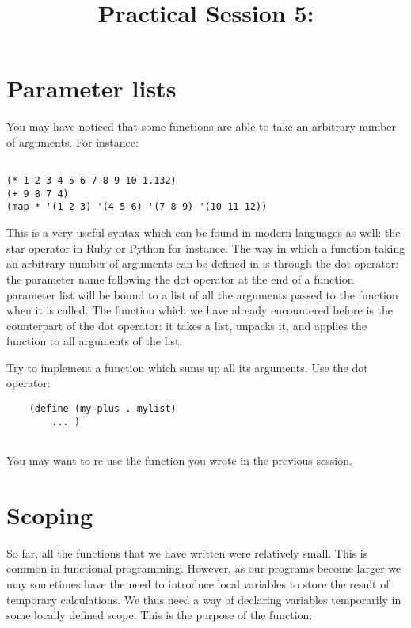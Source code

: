 \documentclass{../../../tp}
\title{Practical Session 5: \scheme}
\author{}
\begin{document}
	
	\maketitle

\section{Parameter lists}

You may have noticed that some \scheme functions are able to take an arbitrary number of arguments. For instance: 

\begin{verbatim}

(* 1 2 3 4 5 6 7 8 9 10 1.132)
(+ 9 8 7 4)
(map * '(1 2 3) '(4 5 6) '(7 8 9) '(10 11 12))

\end{verbatim}

This is a very useful syntax which can be found in modern languages as well: the star operator in Ruby or Python for instance. The way in which a function taking an arbitrary number of arguments can be defined in \scheme is through the dot operator: the parameter name following the dot operator at the end of a function parameter list will be bound to a list of all the arguments passed to the function when it is called. The  function which we have already encountered before is the counterpart of the dot operator: it takes a list, unpacks it, and applies the function to all arguments of the list. 

\begin{instruction}
	Try to implement a  function which sums up all its arguments. Use the dot operator: 
	
	\begin{verbatim}
	(define (my-plus . mylist)
		... )
	
	\end{verbatim}
	
	You may want to re-use the  function you wrote in the previous session.
\end{instruction}


\section{Scoping}

So far, all the functions that we have written were relatively small. This is common in functional programming. However, as our programs become larger we may sometimes have the need to introduce local variables to store the result of temporary calculations. We thus need a way of declaring variables temporarily in some locally defined scope. This is the purpose of the  function:
\end{document}
